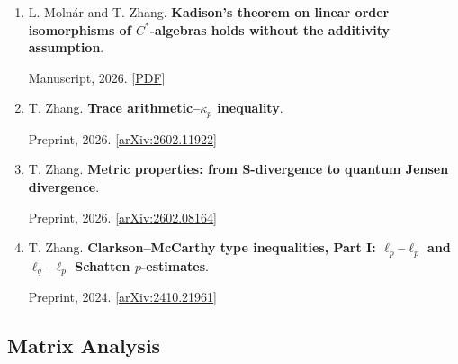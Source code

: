 \documentclass[11pt,letterpaper]{article}
\begin{document}
\begin{enumerate}[resume*=preprints]
\item \begin{minipage}[t]{\linewidth}\raggedright L. Molnár and T. Zhang. \textbf{Kadison's theorem on linear order isomorphisms of \(C^*\)-algebras holds without the additivity assumption}.\par Manuscript, 2026. [\href{https://zhangteng2000.github.io/files/Kadison_vegleges_1.pdf}{PDF}]\end{minipage}

\item \begin{minipage}[t]{\linewidth}\raggedright T. Zhang. \textbf{Trace arithmetic--\(\kappa_p\) inequality}.\par Preprint, 2026. [\href{https://arxiv.org/abs/2602.11922}{arXiv:2602.11922}]\end{minipage}

\item \begin{minipage}[t]{\linewidth}\raggedright T. Zhang. \textbf{Metric properties: from S-divergence to quantum Jensen divergence}.\par Preprint, 2026. [\href{https://arxiv.org/abs/2602.08164}{arXiv:2602.08164}]\end{minipage}

\item \begin{minipage}[t]{\linewidth}\raggedright T. Zhang. \textbf{Clarkson--McCarthy type inequalities, Part I: \(\ell_p\)--\(\ell_p\) and \(\ell_q\)--\(\ell_p\) Schatten \(p\)-estimates}.\par Preprint, 2024. [\href{https://arxiv.org/abs/2410.21961}{arXiv:2410.21961}]\end{minipage}

\end{enumerate}

\subsection{Matrix Analysis}
\end{document}
